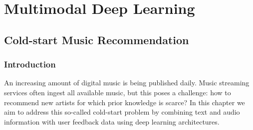
\part{Multimodal Deep Learning}
\label{part:multimodal-deep}

\chapter{Cold-start Music Recommendation}
\label{sec:cold-rec}

\section{Introduction}\label{sec:cold-rec:intro}
\label{sec:cold-rec:intro}



An increasing amount of digital music is being published daily. Music streaming services often ingest all available music, but this poses a challenge: how to recommend new artists for which prior knowledge is scarce? In this chapter we aim to address this so-called cold-start problem by combining text and audio information with user feedback data using deep learning architectures. 


